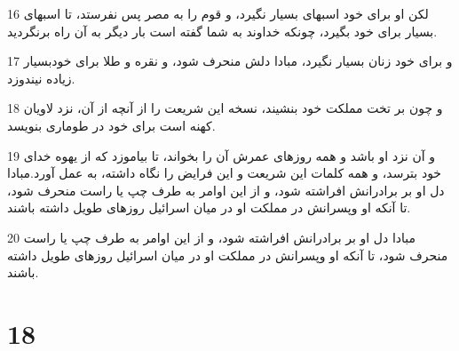 \par 16 لکن او برای خود اسبهای بسیار نگیرد، و قوم را به مصر پس نفرستد، تا اسبهای بسیار برای خود بگیرد، چونکه خداوند به شما گفته است بار دیگر به آن راه برنگردید.
\par 17 و برای خود زنان بسیار نگیرد، مبادا دلش منحرف شود، و نقره و طلا برای خودبسیار زیاده نیندوزد.
\par 18 و چون بر تخت مملکت خود بنشیند، نسخه این شریعت را از آنچه از آن، نزد لاویان کهنه است برای خود در طوماری بنویسد.
\par 19 و آن نزد او باشد و همه روزهای عمرش آن را بخواند، تا بیاموزد که از یهوه خدای خود بترسد، و همه کلمات این شریعت و این فرایض را نگاه داشته، به عمل آورد.مبادا دل او بر برادرانش افراشته شود، و از این اوامر به طرف چپ یا راست منحرف شود، تا آنکه او وپسرانش در مملکت او در میان اسرائیل روزهای طویل داشته باشند.
\par 20 مبادا دل او بر برادرانش افراشته شود، و از این اوامر به طرف چپ یا راست منحرف شود، تا آنکه او وپسرانش در مملکت او در میان اسرائیل روزهای طویل داشته باشند.
 
\chapter{18}

